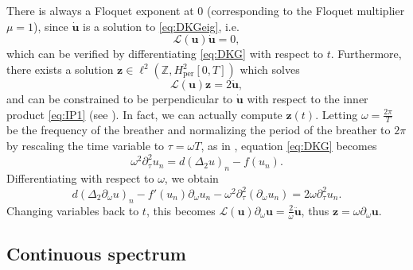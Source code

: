 \documentclass[12pt,reqno]{amsart}
\def\Z{{\mathbb Z}}
\def\per{\textrm{per}}
\def\calL{\mathcal{L}}
\newcommand{\uvec}{\mathbf{u}}
\newcommand{\zvec}{\mathbf{z}}
\begin{document}
There is always a Floquet exponent at 0 (corresponding to the Floquet multiplier $\mu = 1$), since $\dot{\uvec}$ is a solution to \cref{eq:DKGeig}, i.e.
\begin{equation}\label{eq:Lkernel1}
\calL(\uvec)\dot{\uvec} = 0,
\end{equation}
which can be verified by differentiating \cref{eq:DKG} with respect to $t$. Furthermore, there exists a solution $\zvec \in \ell^2(\Z, H^2_\per[0,T])$ which solves 
\begin{equation}
\calL(\uvec)\zvec = 2 \ddot{\uvec},
\end{equation}
and can be constrained to be perpendicular to $\dot{\uvec}$ with respect to the inner product \cref{eq:IP1} (see \cite[Section 3]{Pelinovsky2012}). In fact, we can actually compute $\zvec(t)$. 
Letting $\omega = \frac{2 \pi}{T}$ be the frequency of the breather and normalizing the period of the breather to $2 \pi$ by rescaling the time variable to $\tau = \omega T$, as in \cite{kevrekidis2016}, equation \cref{eq:DKG} becomes
\begin{equation}\label{eq:DKGomega}
\omega^2 \partial_\tau^2 u_n = d (\Delta_2 u)_n - f(u_n).
\end{equation}
Differentiating with respect to $\omega$, we obtain
\begin{equation}\label{eq:DKGdiffw}
d (\Delta_2 \partial_\omega u)_n - f'(u_n)\partial_\omega u_n 
- \omega^2 \partial_\tau^2 ( \partial_\omega u_n) = 2 \omega \partial_\tau^2 u_n.
\end{equation}
Changing variables back to $t$, this becomes $\calL(\uvec)\partial_\omega \uvec = \frac{2}\omega \ddot{\uvec}$, thus $\zvec = \omega \partial_\omega \uvec$.

\subsection{Continuous spectrum}
\end{document}
